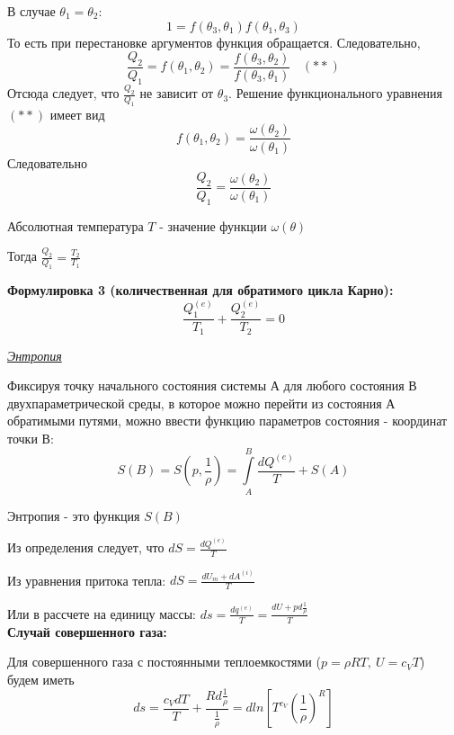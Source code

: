 В случае $\theta_1 = \theta_2$:
$$ 1 = f(\theta_3, \theta_1)f(\theta_1, \theta_3) $$
То есть при перестановке аргументов функция обращается. Следовательно, 
$$ \frac{Q_2}{Q_1} = f(\theta_1, \theta_2) = \frac{f(\theta_3, \theta_2)}{f(\theta_3, \theta_1)} \ \ \ \ (**)$$
Отсюда следует, что $\frac{Q_2}{Q_1}$ не зависит от $\theta_3$.  Решение функционального уравнения $(**)$ имеет вид
$$ f(\theta_1, \theta_2) = \frac{\omega(\theta_2)}{\omega(\theta_1)} $$
Следовательно $$ \frac{Q_2}{Q_1} = \frac{\omega(\theta_2)}{\omega(\theta_1)} $$

\begin{definition}
	Абсолютная температура $T$ - значение функции $\omega(\theta)$
\end{definition}
Тогда $\displaystyle \frac{Q_2}{Q_1} = \frac{T_2}{T_1} $

\textbf{Формулировка 3 (количественная для обратимого цикла Карно):} 
$$ \frac{Q_1^{(e)}}{T_1} + \frac{Q_2^{(e)}}{T_2} = 0 $$

\begin{center}
	\textit{\underline{Энтропия}}
\end{center}

Фиксируя точку начального состояния системы А для любого состояния В двухпараметрической среды, в которое можно перейти из состояния А обратимыми путями, можно ввести функцию параметров состояния - координат точки В:
$$ S(B) = S\left(p, \frac{1}{\rho}\right) = \int\limits_{A}^{B}\frac{dQ^{(e)}}{T} + S(A) $$

\begin{definition}
	 Энтропия - это функция $S(B)$
\end{definition}

Из определения следует, что $\displaystyle dS = \frac{dQ^{(e)}}{T} $

Из уравнения притока тепла:
$\displaystyle dS = \frac{dU_m + dA^{(i)}}{T} $

Или в рассчете на единицу массы:
$\displaystyle ds = \frac{dq^{(e)}}{T} = \frac{dU + pd\frac{1}{\rho}}{T} $  \\
\textbf{Случай совершенного газа:}

Для совершенного газа с постоянными теплоемкостями ($p = \rho R T, \ U = c_V T$) будем иметь
$$ ds = \frac{c_VdT}{T} + \frac{Rd\frac{1}{\rho}}{\frac{1}{\rho}} = dln\left[T^{c_V}\left( \frac{1}{\rho} \right)^{R}\right] $$


